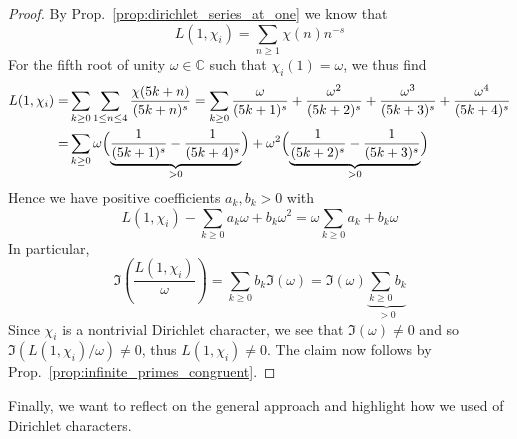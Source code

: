 \documentclass{scrartcl}
\newcommand{\C}{\mathbb{C}}
\theoremstyle{definition}
\begin{document}
\begin{proof}
    By Prop.~\ref{prop:dirichlet_series_at_one} we know that
    \begin{equation*}
        L(1, \chi_i) = \sum_{n \geq 1} \chi(n) n^{-s}
    \end{equation*}
    For the fifth root of unity $\omega \in \C$ such that $\chi_i(1) = \omega$, we thus find
    \begin{align*}
        L(1, \chi_i) =& \sum_{k \geq 0} \sum_{1 \leq n \leq 4} \frac {\chi(5k + n)} {(5k + n)^s} = \sum_{k \geq 0} \frac {\omega} {(5k + 1)^s} + \frac {\omega^2} {(5k + 2)^s} + \frac {\omega^3} {(5k + 3)^s} + \frac {\omega^4} {(5k + 4)^s} \\
        =& \sum_{k \geq 0} \omega \Bigl( \underbrace{\frac 1 {(5k + 1)^s} - \frac 1 {(5k + 4)^s}}_{> 0} \Bigr) + \omega^2 \Bigl( \underbrace{\frac 1 {(5k + 2)^s} - \frac 1 {(5k + 3)^s}}_{> 0} \Bigr)
    \end{align*}
    Hence we have positive coefficients $a_k, b_k > 0$ with
    \begin{equation*}
        L(1, \chi_i) - \sum_{k \geq 0} a_k \omega + b_k \omega^2 = \omega \sum_{k \geq 0} a_k + b_k \omega
    \end{equation*}
    In particular,
    \begin{equation*}
        \Im\left( \frac {L(1, \chi_i)} {\omega} \right) = \sum_{k \geq 0} b_k \Im(\omega) = \Im(\omega) \underbrace{ \sum_{k \geq 0} b_k }_{> 0}
    \end{equation*}
    Since $\chi_i$ is a nontrivial Dirichlet character, we see that $\Im(\omega) \neq 0$ and so $\Im(L(1, \chi_i)/\omega) \neq 0$, thus $L(1, \chi_i) \neq 0$.
    The claim now follows by Prop.~\ref{prop:infinite_primes_congruent}.
\end{proof}
Finally, we want to reflect on the general approach and highlight how we used of Dirichlet characters.
\end{document}
